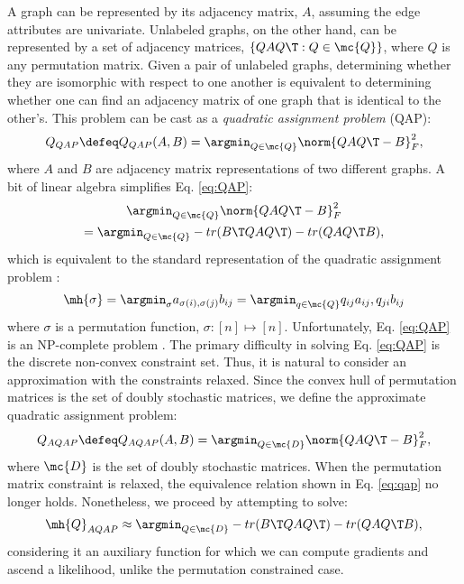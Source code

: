 \documentclass[10pt,journal,cspaper,compsoc]{IEEEtran}
\begin{document}

A graph can be represented by its adjacency matrix, $A$, assuming the edge attributes are univariate.  Unlabeled graphs, on the other hand, can be represented by a set of adjacency matrices, $\{QAQ\T : Q \in \mc{Q}\}$, where $Q$ is any permutation matrix.  Given a pair of unlabeled graphs, determining whether they are isomorphic with respect to one another is equivalent to determining whether one can find an adjacency matrix of one graph that is identical to the other's.  This problem can be cast as a \emph{quadratic assignment problem} (QAP):
 \begin{align} \label{eq:QAP}
	Q_{QAP} \defeq Q_{QAP}(A,B)= \argmin_{Q \in \mc{Q}} \norm{Q A Q\T - B}^2_F,
\end{align}
where $A$ and $B$ are adjacency matrix representations of two different graphs. A bit of linear algebra simplifies Eq. \eqref{eq:QAP}: %
\begin{multline} \label{eq:qap}
	\argmin_{Q \in \mc{Q}} \norm{Q A Q\T - B}^2_F \\
	= \argmin_{Q \in \mc{Q}} - tr(B\T QAQ\T) - tr(QAQ\T B),			
\end{multline}
which is equivalent to the standard representation of the quadratic assignment problem \cite{Conte2004}:
\begin{align}
	\mh{\sigma}= \argmin_{\sigma} a_{\sigma(i), \sigma(j)} b_{ij} = \argmin_{q \in \mc{Q}} q_{ij} a_{ij}, q_{ji} b_{ij}
\end{align}
where $\sigma$ is a permutation function, $\sigma: [n] \mapsto [n]$.  Unfortunately, Eq. \eqref{eq:QAP} is an NP-complete problem \cite{Garey1979a}. The primary difficulty in solving Eq. \eqref{eq:QAP} is the discrete non-convex constraint set.  Thus, it is natural to consider an approximation with the constraints relaxed.  Since the convex hull of permutation matrices is the set of doubly stochastic matrices, we define the approximate quadratic assignment problem:
\begin{align} \label{eq:tqap}
	Q_{AQAP} \defeq Q_{AQAP}(A,B) = \argmin_{Q \in \mc{D}} \norm{Q A Q\T - B}^2_F,
\end{align}
where $\mc{D}$ is the set of doubly stochastic matrices.  When the permutation matrix constraint is relaxed, the equivalence relation shown in Eq. \eqref{eq:qap} no longer holds.  Nonetheless, we proceed by attempting to solve:
\begin{align} \label{eq:nqap}
	\mh{Q}_{AQAP} \approx \argmin_{Q \in \mc{D}} - tr(B\T QAQ\T) - tr(QAQ\T B),
\end{align}
considering it an auxiliary function for which we can compute gradients and ascend a likelihood, unlike the permutation constrained case.  
\end{document}
